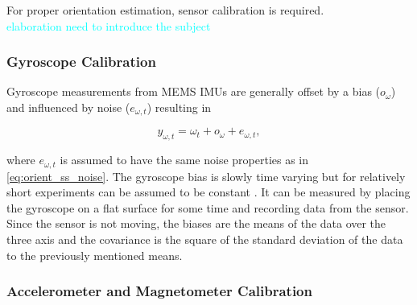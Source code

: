 For proper orientation estimation, sensor calibration is required. \\
\textcolor{cyan}{elaboration need to introduce the subject} 


\subsubsection{Gyroscope Calibration}
Gyroscope measurements from MEMS IMUs are generally offset by a bias ($o_\omega$) and influenced by noise ($e_{\omega, t}$)  resulting in

\begin{equation}
	y_{\omega, t}=\omega_{t}+o_{\omega}+e_{\omega, t},
\end{equation}

where $e_{\omega, t}$ is assumed to have the same noise properties as in \eqref{eq:orient_ss_noise}. The gyroscope bias is slowly time varying but for relatively short experiments can be assumed to be constant \cite{Kok2016}. It can be measured by placing the gyroscope on a flat surface for some time and recording data from the sensor. Since the sensor is not moving, the biases are the means of the data over the three axis and the covariance is the square of the standard deviation of the data to the previously mentioned means.

\subsubsection{Accelerometer and Magnetometer Calibration}

